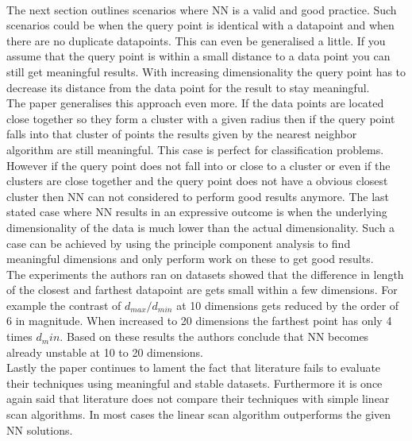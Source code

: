 \documentclass[a4paper,psfig,subfigure,epsfig,fleqn,amssmb,float,caption,fontenc,ausarbeitung]{article}
\begin{document}
\paragraph{}

The next section outlines scenarios where NN is a valid and good practice. Such scenarios could be when the query point is identical with a datapoint and when there are no duplicate datapoints. This can even be generalised a little. If you assume that the query point is within a small distance to a data point you can still get meaningful results. With increasing dimensionality the query point has to decrease its distance from the data point for the result to stay meaningful. \\
The paper generalises this approach even more. If the data points are located close together so they form a cluster with a given radius then if the query point falls into that cluster of points the results given by the nearest neighbor algorithm are still meaningful. This case is perfect for classification problems. However if the query point does not fall into or close to a cluster or even if the clusters are close together and the query point does not have a obvious closest cluster then NN can not considered to perform good results anymore.
The last stated case where NN results in an expressive outcome is when the underlying dimensionality of the data is much lower than the actual dimensionality. Such a case can be achieved by using the principle component analysis to find meaningful dimensions and only perform work on these to get good results. \\
The experiments the authors ran on datasets showed that the difference in length of the closest and farthest datapoint are gets small within a few dimensions. For example the contrast of $ d_{max} / d_{min} $ at 10 dimensions gets reduced by the order of 6 in magnitude. When increased to 20 dimensions the farthest point has only 4 times $ d_min $. Based on these results the authors conclude that NN becomes already unstable at 10 to 20 dimensions.\\
Lastly the paper continues to lament the fact that literature fails to evaluate their techniques using meaningful and stable datasets. Furthermore it is once again said that literature does not compare their techniques with simple linear scan algorithms. In most cases the linear scan algorithm outperforms the given NN solutions.
 \pagebreak


\fontsize{9}{10pt}


\end{document}
